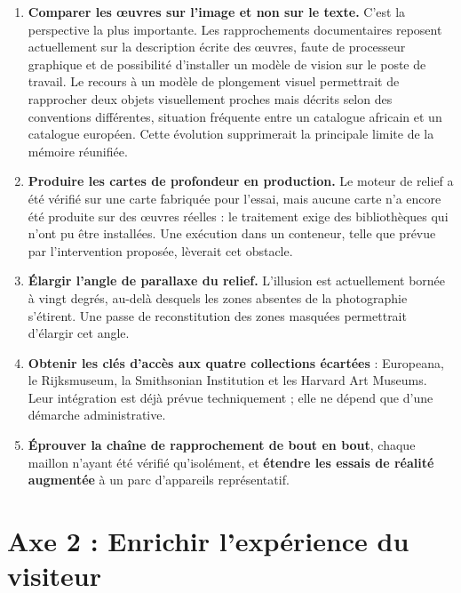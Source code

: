 \begin{enumerate}
  \item \textbf{Comparer les œuvres sur l'image et non sur le texte.} C'est la
        perspective la plus importante. Les rapprochements documentaires
        reposent actuellement sur la description écrite des œuvres, faute de
        processeur graphique et de possibilité d'installer un modèle de vision
        sur le poste de travail. Le recours à un modèle de plongement visuel
        permettrait de rapprocher deux objets visuellement proches mais décrits
        selon des conventions différentes, situation fréquente entre un
        catalogue africain et un catalogue européen. Cette évolution supprimerait
        la principale limite de la mémoire réunifiée.

  \item \textbf{Produire les cartes de profondeur en production.} Le moteur de
        relief a été vérifié sur une carte fabriquée pour l'essai, mais aucune
        carte n'a encore été produite sur des œuvres réelles : le traitement
        exige des bibliothèques qui n'ont pu être installées. Une exécution dans
        un conteneur, telle que prévue par l'intervention proposée, lèverait cet
        obstacle.

  \item \textbf{Élargir l'angle de parallaxe du relief.} L'illusion est
        actuellement bornée à vingt degrés, au-delà desquels les zones absentes
        de la photographie s'étirent. Une passe de reconstitution des zones
        masquées permettrait d'élargir cet angle.

  \item \textbf{Obtenir les clés d'accès aux quatre collections écartées} : Europeana, le Rijksmuseum, la Smithsonian Institution et les Harvard Art
        Museums. Leur intégration est déjà prévue techniquement ; elle ne dépend
        que d'une démarche administrative.

  \item \textbf{Éprouver la chaîne de rapprochement de bout en bout}, chaque
        maillon n'ayant été vérifié qu'isolément, et \textbf{étendre les essais
        de réalité augmentée} à un parc d'appareils représentatif.
\end{enumerate}

\section*{Axe 2 : Enrichir l'expérience du visiteur}

